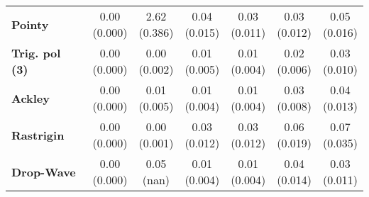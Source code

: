 \begin{table}[t]
\begin{threeparttable}
\begin{tabular}{l|cccccc}
\vspace{6pt}\textbf{Pointy} & \cellbreak[t]{0.00\\\footnotesize(0.000)} & \cellbreak[t]{2.62\\\footnotesize(0.386)} & \cellbreak[t]{0.04\\\footnotesize(0.015)} & \cellbreak[t]{0.03\\\footnotesize(0.011)} & \cellbreak[t]{0.03\\\footnotesize(0.012)} & \cellbreak[t]{0.05\\\footnotesize(0.016)}\\
\vspace{6pt}\textbf{Trig. pol (3)} & \cellbreak[t]{0.00\\\footnotesize(0.000)} & \cellbreak[t]{0.00\\\footnotesize(0.002)} & \cellbreak[t]{0.01\\\footnotesize(0.005)} & \cellbreak[t]{0.01\\\footnotesize(0.004)} & \cellbreak[t]{0.02\\\footnotesize(0.006)} & \cellbreak[t]{0.03\\\footnotesize(0.010)}\\
\vspace{6pt}\textbf{Ackley} & \cellbreak[t]{0.00\\\footnotesize(0.000)} & \cellbreak[t]{0.01\\\footnotesize(0.005)} & \cellbreak[t]{0.01\\\footnotesize(0.004)} & \cellbreak[t]{0.01\\\footnotesize(0.004)} & \cellbreak[t]{0.03\\\footnotesize(0.008)} & \cellbreak[t]{0.04\\\footnotesize(0.013)}\\
\vspace{6pt}\textbf{Rastrigin} & \cellbreak[t]{0.00\\\footnotesize(0.000)} & \cellbreak[t]{0.00\\\footnotesize(0.001)} & \cellbreak[t]{0.03\\\footnotesize(0.012)} & \cellbreak[t]{0.03\\\footnotesize(0.012)} & \cellbreak[t]{0.06\\\footnotesize(0.019)} & \cellbreak[t]{0.07\\\footnotesize(0.035)}\\
\vspace{6pt}\textbf{Drop-Wave} & \cellbreak[t]{0.00\\\footnotesize(0.000)} & \cellbreak[t]{0.05\\\footnotesize(nan)} & \cellbreak[t]{0.01\\\footnotesize(0.004)} & \cellbreak[t]{0.01\\\footnotesize(0.004)} & \cellbreak[t]{0.04\\\footnotesize(0.014)} & \cellbreak[t]{0.03\\\footnotesize(0.011)}\\

\end{tabular}
\end{threeparttable}
\end{table}
